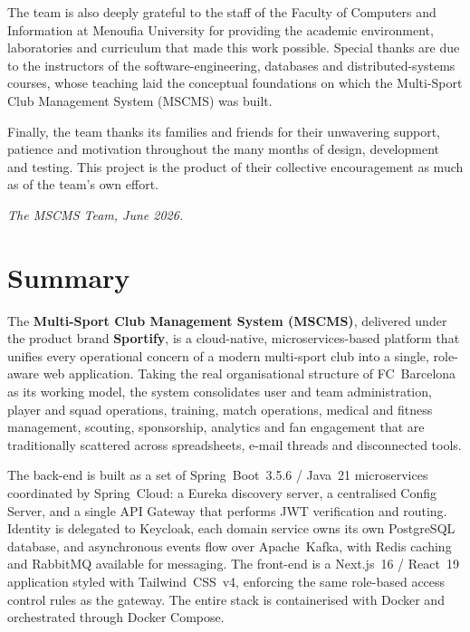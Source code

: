 \documentclass[12pt,a4paper]{report}
\newcommand{\univName}{Menoufia University}      %
\newcommand{\facultyName}{Faculty of Computers and Information}
\newcommand{\submissionDate}{June 2026}
\begin{document}
The team is also deeply grateful to the staff of the \facultyName{} at
\univName{} for providing the academic environment, laboratories and curriculum
that made this work possible. Special thanks are due to the instructors of the
software-engineering, databases and distributed-systems courses, whose teaching
laid the conceptual foundations on which the Multi-Sport Club Management System
(MSCMS) was built.

Finally, the team thanks its families and friends for their unwavering support,
patience and motivation throughout the many months of design, development and
testing. This project is the product of their collective encouragement as much
as of the team's own effort.

\vspace{1cm}
\noindent\textit{The MSCMS Team, \submissionDate.}

\chapter*{Summary}

The \textbf{Multi-Sport Club Management System (MSCMS)}, delivered under the
product brand \textbf{Sportify}, is a cloud-native, microservices-based platform
that unifies every operational concern of a modern multi-sport club into a
single, role-aware web application. Taking the real organisational structure of
FC~Barcelona as its working model, the system consolidates user and team
administration, player and squad operations, training, match operations, medical
and fitness management, scouting, sponsorship, analytics and fan engagement that
are traditionally scattered across spreadsheets, e-mail threads and disconnected
tools.

The back-end is built as a set of Spring~Boot~3.5.6 / Java~21 microservices
coordinated by Spring~Cloud: a Eureka discovery server, a centralised Config
Server, and a single API Gateway that performs JWT verification and routing.
Identity is delegated to Keycloak, each domain service owns its own PostgreSQL
database, and asynchronous events flow over Apache~Kafka, with Redis caching and
RabbitMQ available for messaging. The front-end is a Next.js~16 / React~19
application styled with Tailwind~CSS~v4, enforcing the same role-based access
control rules as the gateway. The entire stack is containerised with Docker and
orchestrated through Docker Compose.
\end{document}
